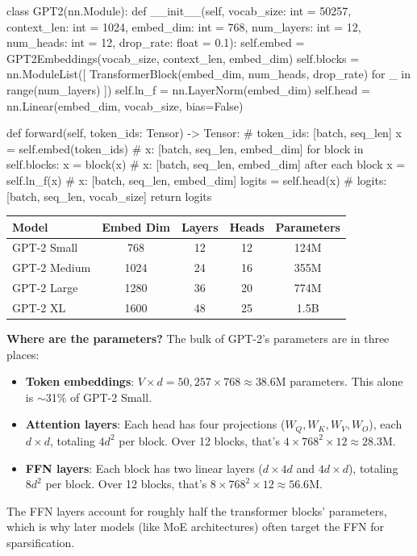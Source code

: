 \begin{pseudocode}
class GPT2(nn.Module):
    def __init__(self, vocab_size: int = 50257,
                 context_len: int = 1024,
                 embed_dim: int = 768,
                 num_layers: int = 12,
                 num_heads: int = 12,
                 drop_rate: float = 0.1):
        self.embed = GPT2Embeddings(vocab_size, context_len, embed_dim)
        self.blocks = nn.ModuleList([
            TransformerBlock(embed_dim, num_heads, drop_rate)
            for _ in range(num_layers)
        ])
        self.ln_f = nn.LayerNorm(embed_dim)
        self.head = nn.Linear(embed_dim, vocab_size, bias=False)

    def forward(self, token_ids: Tensor) -> Tensor:
        # token_ids: [batch, seq_len]
        x = self.embed(token_ids)
        # x: [batch, seq_len, embed_dim]
        for block in self.blocks:
            x = block(x)
            # x: [batch, seq_len, embed_dim] after each block
        x = self.ln_f(x)
        # x: [batch, seq_len, embed_dim]
        logits = self.head(x)
        # logits: [batch, seq_len, vocab_size]
        return logits
\end{pseudocode}

\begin{center}
\begin{tabular}{lcccc}
\toprule
\textbf{Model} & \textbf{Embed Dim} & \textbf{Layers} & \textbf{Heads} & \textbf{Parameters} \\
\midrule
GPT-2 Small  & 768  & 12 & 12 & 124M \\
GPT-2 Medium & 1024 & 24 & 16 & 355M \\
GPT-2 Large  & 1280 & 36 & 20 & 774M \\
GPT-2 XL     & 1600 & 48 & 25 & 1.5B \\
\bottomrule
\end{tabular}
\end{center}

\begin{keyconcept}
  \textbf{Where are the parameters?} The bulk of GPT-2's parameters are in
  three places:
  \begin{itemize}
    \item \textbf{Token embeddings}: $V \times d = 50{,}257 \times 768 \approx 38.6\text{M}$
          parameters. This alone is $\sim$31\% of GPT-2 Small.
    \item \textbf{Attention layers}: Each head has four projections
          ($W_Q, W_K, W_V, W_O$), each $d \times d$, totaling $4d^2$ per
          block. Over 12 blocks, that's $4 \times 768^2 \times 12 \approx 28.3\text{M}$.
    \item \textbf{FFN layers}: Each block has two linear layers
          ($d \times 4d$ and $4d \times d$), totaling $8d^2$ per block.
          Over 12 blocks, that's $8 \times 768^2 \times 12 \approx 56.6\text{M}$.
  \end{itemize}
  The FFN layers account for roughly half the transformer blocks' parameters,
  which is why later models (like MoE architectures) often target the FFN for
  sparsification.
\end{keyconcept}

